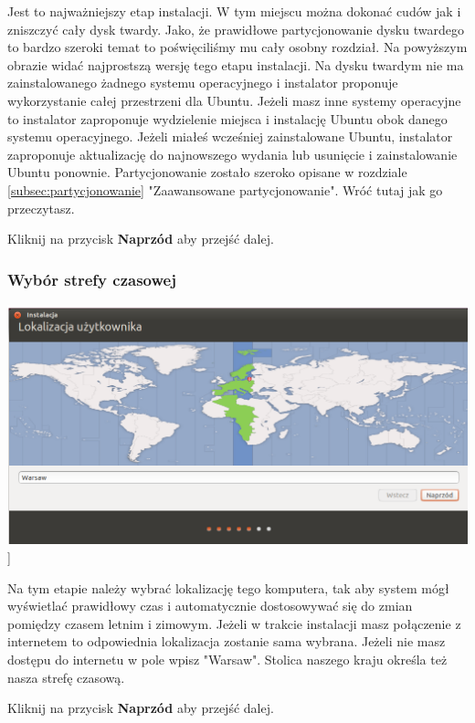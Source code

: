 Jest to najważniejszy etap instalacji. W tym miejscu można dokonać cudów jak i zniszczyć cały dysk twardy. Jako, że prawidłowe partycjonowanie dysku twardego to bardzo szeroki temat to poświęciliśmy mu cały osobny rozdział. Na powyższym obrazie widać najprostszą wersję tego etapu instalacji. Na dysku twardym nie ma zainstalowanego żadnego systemu operacyjnego i instalator proponuje wykorzystanie całej przestrzeni dla Ubuntu. Jeżeli masz inne systemy operacyjne to instalator zaproponuje wydzielenie miejsca i instalację Ubuntu obok danego systemu operacyjnego. Jeżeli miałeś wcześniej zainstalowane Ubuntu, instalator zaproponuje aktualizację do najnowszego wydania lub usunięcie i zainstalowanie Ubuntu ponownie.
Partycjonowanie zostało szeroko opisane w rozdziale \ref{subsec:partycjonowanie} "Zaawansowane partycjonowanie". Wróć tutaj jak go przeczytasz.
\begin{flushright}
Kliknij na przycisk \textbf{Naprzód} aby przejść dalej.
\end{flushright}
\clearpage
\subsubsection{Wybór strefy czasowej}
\label{subsub:instalator_strefa_czasowa}
\begin{center}
        \includegraphics[scale=0.5]{images/instalator_czas.png}]
\end{center}

Na tym etapie należy wybrać lokalizację tego komputera, tak aby system mógł wyświetlać prawidłowy czas i automatycznie dostosowywać się do zmian pomiędzy czasem letnim i zimowym. Jeżeli w trakcie instalacji masz połączenie z internetem to odpowiednia lokalizacja zostanie sama wybrana. Jeżeli nie masz dostępu do internetu w pole wpisz "Warsaw". Stolica naszego kraju określa też nasza strefę czasową.
\begin{flushright}
Kliknij na przycisk \textbf{Naprzód} aby przejść dalej.
\end{flushright}
\clearpage
